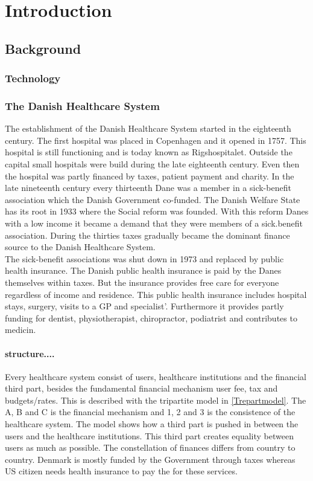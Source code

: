 \chapter{Introduction}

\section{Background}
\subsection{Technology}
\subsection{The Danish Healthcare System}



The establishment of the Danish Healthcare System started in the eighteenth century. The first hospital was placed in Copenhagen and it opened in 1757. This hospital is still functioning and is today known as Rigshospitalet. Outside the capital small hospitals were build during the late eighteenth century. Even then the hospital was partly financed by taxes, patient payment and charity. In the late nineteenth century every thirteenth Dane was a member in a sick-benefit association which the Danish Government co-funded. The Danish Welfare State has its root in 1933 where the Social reform was founded. With this reform Danes with a low income it became a demand that they were members of a sick.benefit association. During the thirties taxes gradually became the dominant finance source to the Danish Healthcare System.\\ 
The sick-benefit associations was shut down in 1973 and replaced by public health insurance. The Danish public health insurance is paid by the Danes themselves within taxes. But the insurance provides free care for everyone regardless of  income and residence. This public health insurance includes hospital stays, surgery, visits to a GP and specialist'. Furthermore it provides partly funding for dentist, physiotherapist, chiropractor, podiatrist and contributes to medicin.   \\
\subsubsection{structure....}
Every healthcare system consist of users, healthcare institutions and the financial third part, besides the fundamental financial mechanism user fee, tax and budgets/rates. This is described with the tripartite model in \cref{Trepartmodel}. The A, B and C is the financial mechanism and 1, 2 and 3 is the consistence of the healthcare system. The model shows how a third part is pushed in between the users and the healthcare institutions. This third part creates equality between users as much as possible. The constellation of finances differs from country to country. Denmark is mostly funded by the Government through taxes whereas US citizen needs health insurance to pay the for these services\cite{sundhedsvaesen}. \\
 

